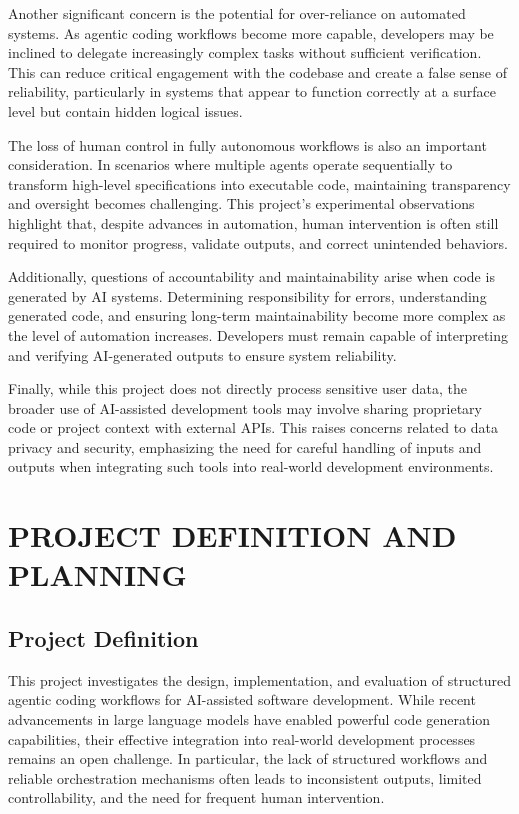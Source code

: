 \documentclass[a4paper,12pt]{report}
\begin{document}
Another significant concern is the potential for over-reliance on automated systems. As agentic coding workflows become more capable, developers may be inclined to delegate increasingly complex tasks without sufficient verification. This can reduce critical engagement with the codebase and create a false sense of reliability, particularly in systems that appear to function correctly at a surface level but contain hidden logical issues.

The loss of human control in fully autonomous workflows is also an important consideration. In scenarios where multiple agents operate sequentially to transform high-level specifications into executable code, maintaining transparency and oversight becomes challenging. This project's experimental observations highlight that, despite advances in automation, human intervention is often still required to monitor progress, validate outputs, and correct unintended behaviors.

Additionally, questions of accountability and maintainability arise when code is generated by AI systems. Determining responsibility for errors, understanding generated code, and ensuring long-term maintainability become more complex as the level of automation increases. Developers must remain capable of interpreting and verifying AI-generated outputs to ensure system reliability.

Finally, while this project does not directly process sensitive user data, the broader use of AI-assisted development tools may involve sharing proprietary code or project context with external APIs. This raises concerns related to data privacy and security, emphasizing the need for careful handling of inputs and outputs when integrating such tools into real-world development environments.

\chapter{PROJECT DEFINITION AND PLANNING}
\section{Project Definition}
This project investigates the design, implementation, and evaluation of structured agentic coding workflows for AI-assisted software development. While recent advancements in large language models have enabled powerful code generation capabilities, their effective integration into real-world development processes remains an open challenge. In particular, the lack of structured workflows and reliable orchestration mechanisms often leads to inconsistent outputs, limited controllability, and the need for frequent human intervention.
\end{document}
